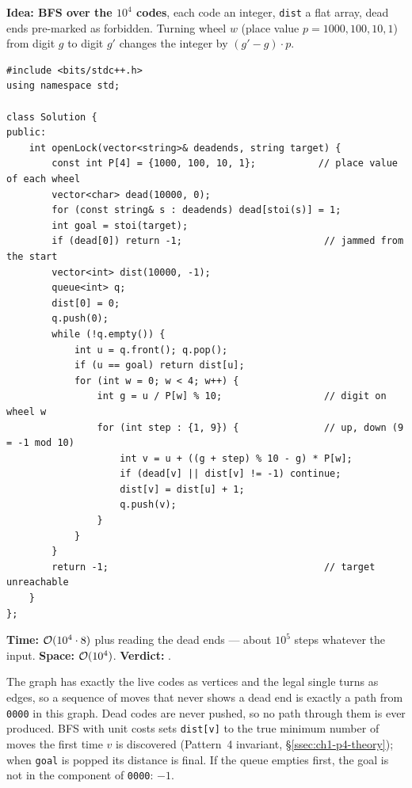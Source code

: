 \begin{algorithmbox}
\textbf{Idea: BFS over the $10^4$ codes}, each code an integer, \texttt{dist} a flat array, dead ends pre-marked as forbidden. Turning wheel $w$ (place value $p = 1000, 100, 10, 1$) from digit $g$ to digit $g'$ changes the integer by $(g' - g)\cdot p$.

\begin{lstlisting}[style=cpp]
#include <bits/stdc++.h>
using namespace std;

class Solution {
public:
    int openLock(vector<string>& deadends, string target) {
        const int P[4] = {1000, 100, 10, 1};           // place value of each wheel
        vector<char> dead(10000, 0);
        for (const string& s : deadends) dead[stoi(s)] = 1;
        int goal = stoi(target);
        if (dead[0]) return -1;                         // jammed from the start
        vector<int> dist(10000, -1);
        queue<int> q;
        dist[0] = 0;
        q.push(0);
        while (!q.empty()) {
            int u = q.front(); q.pop();
            if (u == goal) return dist[u];
            for (int w = 0; w < 4; w++) {
                int g = u / P[w] % 10;                  // digit on wheel w
                for (int step : {1, 9}) {               // up, down (9 = -1 mod 10)
                    int v = u + ((g + step) % 10 - g) * P[w];
                    if (dead[v] || dist[v] != -1) continue;
                    dist[v] = dist[u] + 1;
                    q.push(v);
                }
            }
        }
        return -1;                                      // target unreachable
    }
};
\end{lstlisting}

\begin{complexitybox}
\textbf{Time:} $\mathcal{O}(10^4 \cdot 8)$ plus reading the dead ends --- about $10^5$ steps whatever the input. \textbf{Space:} $\mathcal{O}(10^4)$. \textbf{Verdict:} \ac{}.
\end{complexitybox}
\end{algorithmbox}

\begin{invariantbox}
The graph has exactly the live codes as vertices and the legal single turns as edges, so a sequence of moves that never shows a dead end is exactly a path from \texttt{0000} in this graph. Dead codes are never pushed, so no path through them is ever produced. BFS with unit costs sets \texttt{dist[v]} to the true minimum number of moves the first time $v$ is discovered (Pattern~4 invariant, \S\ref{ssec:ch1-p4-theory}); when \texttt{goal} is popped its distance is final. If the queue empties first, the goal is not in the component of \texttt{0000}: $-1$.
\end{invariantbox}

